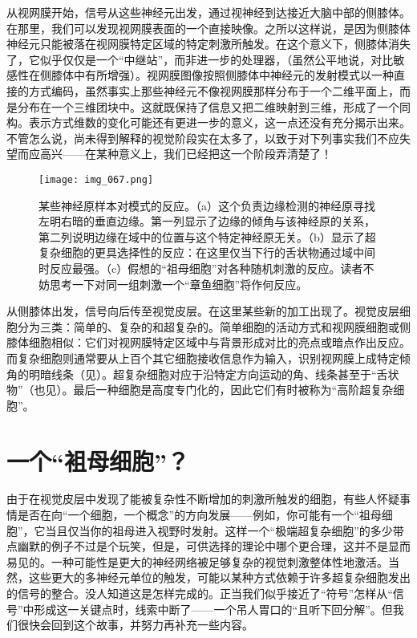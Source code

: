 从视网膜开始，信号从这些神经元出发，通过视神经到达接近大脑中部的侧膝体。在那里，我们可以发现视网膜表面的一个直接映像。之所以这样说，是因为侧膝体神经元只能被落在视网膜特定区域的特定刺激所触发。在这个意义下，侧膝体消失了，它似乎仅仅是一个“中继站”，而非进一步的处理器，（虽然公平地说，对比敏感性在侧膝体中有所增强）。视网膜图像按照侧膝体中神经元的发射模式以一种直接的方式编码，虽然事实上那些神经元不像视网膜那样分布于一个二维平面上，而是分布在一个三维团块中。这就既保持了信息又把二维映射到三维，形成了一个同构。表示方式维数的变化可能还有更进一步的意义，这一点还没有充分揭示出来。不管怎么说，尚未得到解释的视觉阶段实在太多了，以致于对下列事实我们不应失望而应高兴——在某种意义上，我们已经把这一个阶段弄清楚了！

\begin{figure}
\texttt{[image: img\_067.png]}
\caption[某些神经元样本对模式的反应。]
  {某些神经原样本对模式的反应。（a）这个负责边缘检测的神经原寻找左明右暗的垂直边缘。第一列显示了边缘的倾角与该神经原的关系，第二列说明边缘在域中的位置与这个特定神经原无关。（b）显示了超复杂细胞的更具选择性的反应：在这里仅当下行的舌状物通过域中间时反应最强。（c）假想的“祖母细胞”对各种随机刺激的反应。读者不妨思考一下对同一组刺激一个“章鱼细胞”将作何反应。}
\end{figure}

从侧膝体出发，信号向后传至视觉皮层。在这里某些新的加工出现了。视觉皮层细胞分为三类：简单的、复杂的和超复杂的。简单细胞的活动方式和视网膜细胞或侧膝体细胞相似：它们对视网膜特定区域中与背景形成对比的亮点或暗点作出反应。而复杂细胞则通常要从上百个其它细胞接收信息作为输入，识别视网膜上成特定倾角的明暗线条（见）。超复杂细胞对应于沿特定方向运动的角、线条甚至于“舌状物”（也见）。最后一种细胞是高度专门化的，因此它们有时被称为“高阶超复杂细胞”。

\section{一个“袓母细胞”？}

由于在视觉皮层中发现了能被复杂性不断增加的刺激所触发的细胞，有些人怀疑事情是否在向“一个细胞，一个概念”的方向发展——例如，你可能有一个“祖母细胞”，它当且仅当你的祖母进入视野时发射。这样一个“极端超复杂细胞”的多少带点幽默的例子不过是个玩笑，但是，可供选择的理论中哪个更合理，这并不是显而易见的。一种可能性是更大的神经网络被足够复杂的视觉刺激整体性地激活。当然，这些更大的多神经元单位的触发，可能以某种方式依赖于许多超复杂细胞发出的信号的整合。没人知道这是怎样完成的。正当我们似乎接近了“符号”怎样从“信号”中形成这一关键点时，线索中断了——一个吊人胃口的“且听下回分解”。但我们很快会回到这个故事，并努力再补充一些内容。

